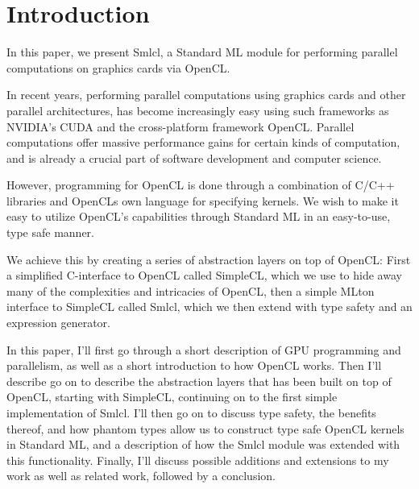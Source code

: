 \section{Introduction}

In this paper, we present Smlcl, a Standard ML module for performing
parallel computations on graphics cards via OpenCL.

In recent years, performing parallel computations using graphics cards
and other parallel architectures, has become increasingly easy using
such frameworks as NVIDIA's CUDA and the cross-platform framework
OpenCL. Parallel computations offer massive performance gains for
certain kinds of computation, and is already a crucial part of
software development and computer science.

However, programming for OpenCL is done through a combination of C/C++
libraries and OpenCLs own language for specifying kernels. We wish to
make it easy to utilize OpenCL's capabilities through Standard ML in an
easy-to-use, type safe manner.

We achieve this by creating a series of abstraction layers on top of
OpenCL: First a simplified C-interface to OpenCL called SimpleCL,
which we use to hide away many of the complexities and intricacies of
OpenCL, then a simple MLton interface to SimpleCL called Smlcl, which
we then extend with type safety and an expression generator.

In this paper, I'll first go through a short description of GPU
programming and parallelism, as well as a short introduction to how
OpenCL works. Then I'll describe go on to describe the abstraction
layers that has been built on top of OpenCL, starting with SimpleCL,
continuing on to the first simple implementation of Smlcl. I'll then
go on to discuss type safety, the benefits thereof, and how phantom
types allow us to construct type safe OpenCL kernels in Standard ML,
and a description of how the Smlcl module was extended with this
functionality. Finally, I'll discuss possible additions and extensions
to my work as well as related work, followed by a conclusion.
